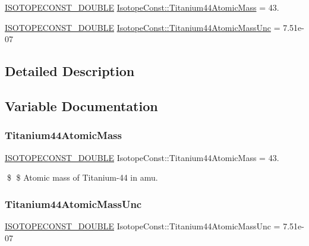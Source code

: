 \begin{DoxyCompactItemize}
\item 
\mbox{\hyperlink{group___isotope_const-_macros_ga8f45a7272ce02c0b4c65c44636ed719a}{I\+S\+O\+T\+O\+P\+E\+C\+O\+N\+S\+T\+\_\+\+D\+O\+U\+B\+LE}} \mbox{\hyperlink{group___isotope_const-_titanium-_ti44_gad163d6dee4fc8a7384c44c8d2add9c24}{Isotope\+Const\+::\+Titanium44\+Atomic\+Mass}} = 43.
\item 
\mbox{\hyperlink{group___isotope_const-_macros_ga8f45a7272ce02c0b4c65c44636ed719a}{I\+S\+O\+T\+O\+P\+E\+C\+O\+N\+S\+T\+\_\+\+D\+O\+U\+B\+LE}} \mbox{\hyperlink{group___isotope_const-_titanium-_ti44_ga9d0f2cd4143abee341b3bbd5740a6592}{Isotope\+Const\+::\+Titanium44\+Atomic\+Mass\+Unc}} = 7.\+51e-\/07
\end{DoxyCompactItemize}


\subsection{Detailed Description}


\subsection{Variable Documentation}
\mbox{\label{group___isotope_const-_titanium-_ti44_gad163d6dee4fc8a7384c44c8d2add9c24}} 
\subsubsection{\texorpdfstring{Titanium44\+Atomic\+Mass}{Titanium44AtomicMass}}
{\footnotesize\ttfamily \mbox{\hyperlink{group___isotope_const-_macros_ga8f45a7272ce02c0b4c65c44636ed719a}{I\+S\+O\+T\+O\+P\+E\+C\+O\+N\+S\+T\+\_\+\+D\+O\+U\+B\+LE}} Isotope\+Const\+::\+Titanium44\+Atomic\+Mass = 43.}

\$ \$ Atomic mass of Titanium-\/44 in amu. \mbox{\label{group___isotope_const-_titanium-_ti44_ga9d0f2cd4143abee341b3bbd5740a6592}} 
\subsubsection{\texorpdfstring{Titanium44\+Atomic\+Mass\+Unc}{Titanium44AtomicMassUnc}}
{\footnotesize\ttfamily \mbox{\hyperlink{group___isotope_const-_macros_ga8f45a7272ce02c0b4c65c44636ed719a}{I\+S\+O\+T\+O\+P\+E\+C\+O\+N\+S\+T\+\_\+\+D\+O\+U\+B\+LE}} Isotope\+Const\+::\+Titanium44\+Atomic\+Mass\+Unc = 7.\+51e-\/07}

